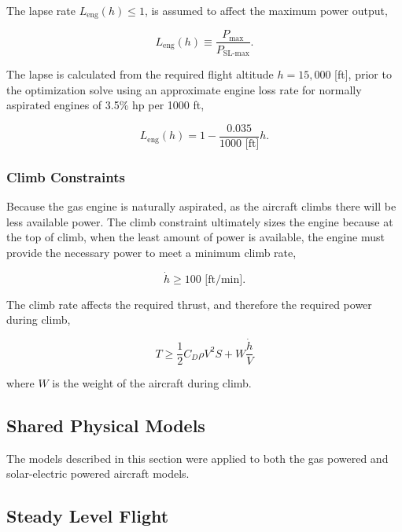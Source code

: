 The lapse rate $L_{\text{eng}}(h) \leq 1$, is assumed to affect the maximum power output,

\begin{equation}
    \label{e:lapse}
    L_{\text{eng}}(h) \equiv \frac{P_{\text{max}}}{P_{\text{SL-max}}}.
\end{equation}

The lapse is calculated from the required flight altitude $h=15,000$ [ft], prior to the optimization solve using an approximate engine loss rate for normally aspirated engines of 3.5\% hp per 1000 ft,\cite{enginelapse}

\begin{equation}
    \label{e:lapsefit}
    L_{\text{eng}}(h) = 1 - \frac{0.035}{1000 \text{ [ft]}} h.
\end{equation}

\subsubsection{Climb Constraints}

Because the gas engine is naturally aspirated, as the aircraft climbs there will be less available power.  
The climb constraint ultimately sizes the engine because at the top of climb, when the least amount of power is available, the engine must provide the necessary power to meet a minimum climb rate, 

\begin{equation}
    \label{e:climbrate}
    \dot{h} \geq 100 \text{ [ft/min]}.
\end{equation}

The climb rate affects the required thrust, and therefore the required power during climb, 

\begin{equation}
    \label{e:climb}
    T \geq \frac{1}{2} C_D \rho V^2 S + W \frac{\dot{h}}{V}
\end{equation}

where $W$ is the weight of the aircraft during climb.  

\subsection{Shared Physical Models}

The models described in this section were applied to both the gas powered and solar-electric powered aircraft models. 

\subsection{Steady Level Flight}

